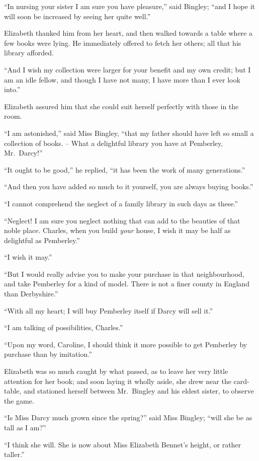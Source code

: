 “In nursing your sister I am sure you have pleasure,”
said Bingley; “and I hope it will soon be increased by
seeing her quite well.”

Elizabeth thanked him from her heart, and then walked
towards a table where a few books were lying. He immediately
offered to fetch her others; all that his library
afforded.

“And I wish my collection were larger for your benefit
and my own credit; but I am an idle fellow, and though
I have not many, I have more than I ever look into.”

Elizabeth assured him that she could suit herself perfectly
with those in the room.

“I am astonished,” said Miss Bingley, “that my father
should have left so small a collection of books. -- What
a delightful library you have at Pemberley, Mr.\ Darcy!”

“It ought to be good,” he replied, “it has been the
work of many generations.”

“And then you have added so much to it yourself, you
are always buying books.”

“I cannot comprehend the neglect of a family library
in such days as these.”

“Neglect! I am sure you neglect nothing that can add
to the beauties of that noble place. Charles, when you
build \textit{your} house, I wish it may be half as delightful as
Pemberley.”

“I wish it may.”

“But I would really advise you to make your purchase in
that neighbourhood, and take Pemberley for a kind of model.
There is not a finer county in England than Derbyshire.”

“With all my heart; I will buy Pemberley itself if
Darcy will sell it.”

“I am talking of possibilities, Charles.”

“Upon my word, Caroline, I should think it more
possible to get Pemberley by purchase than by imitation.”

Elizabeth was so much caught by what passed, as to
leave her very little attention for her book; and soon
laying it wholly aside, she drew near the card-table, and
stationed herself between Mr.\ Bingley and his eldest sister,
to observe the game.

“Is Miss Darcy much grown since the spring?” said
Miss Bingley; “will she be as tall as I am?”

“I think she will. She is now about Miss Elizabeth
Bennet’s height, or rather taller.”

